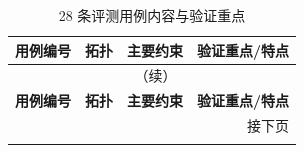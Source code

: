 \begin{longtable}{p{2.1cm}p{1.3cm}p{5.0cm}p{5.4cm}}
\caption{28 条评测用例内容与验证重点}
\label{tab:cases_overview}\\
\toprule
\textbf{用例编号} & \textbf{拓扑} & \textbf{主要约束} & \textbf{验证重点/特点} \\
\midrule
\endfirsthead

\multicolumn{4}{c}{\tablename\ \thetable{}（续）} \\
\toprule
\textbf{用例编号} & \textbf{拓扑} & \textbf{主要约束} & \textbf{验证重点/特点} \\
\midrule
\endhead

\midrule
\multicolumn{4}{r}{接下页} \\
\endfoot

\bottomrule
\endlastfoot


\end{longtable}
